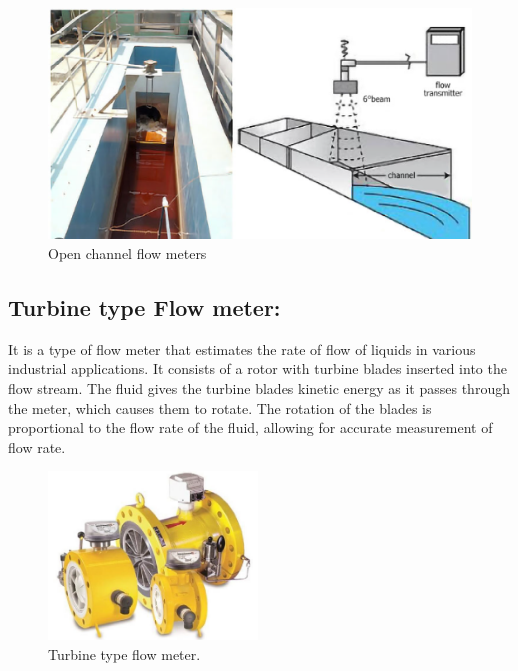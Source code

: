 \begin{figure}[h!]
    \centering
    \includegraphics[width=0.8\linewidth]{figs/flowmeters/image22.png}
    \caption{Open channel flow meters}
    \label{fig:Open channel flow meters}
\end{figure}




\subsection{Turbine type Flow meter:}

It is a type of flow meter that estimates the rate of flow of liquids in
various industrial applications. It consists of a rotor with turbine
blades inserted into the flow stream. The fluid gives the turbine blades
kinetic energy as it passes through the meter, which causes them to
rotate. The rotation of the blades is proportional to the flow rate of
the fluid, allowing for accurate measurement of flow rate.

\begin{figure}[h!]
    \centering
    \includegraphics[width=2.18787in,height=1.76042in]{figs/flowmeters/image23.png}
    \caption{Turbine type flow meter.}
    \label{fig:Turbine type flow meter}
\end{figure}

